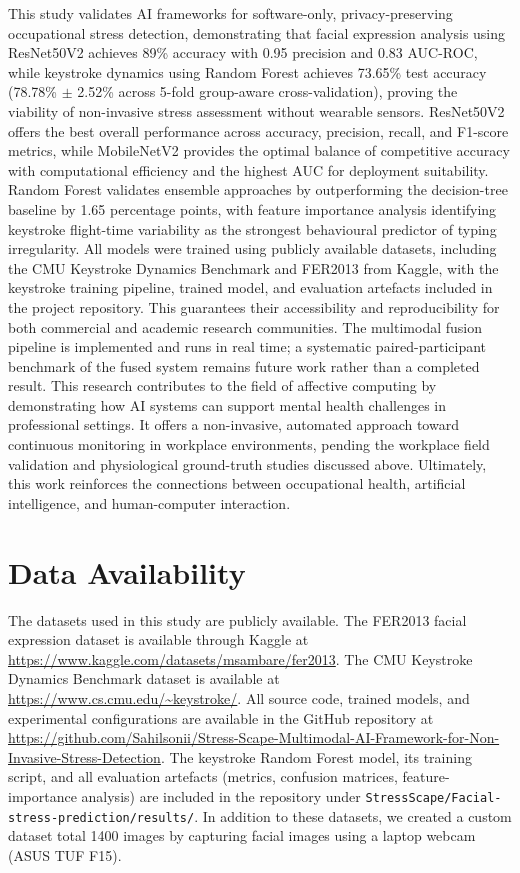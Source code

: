 \documentclass[fleqn,10pt]{wlscirep}
\begin{document}
This study validates AI frameworks for software-only, privacy-preserving occupational stress detection, demonstrating that facial expression analysis using ResNet50V2 achieves 89\% accuracy with 0.95 precision and 0.83 AUC-ROC, while keystroke dynamics using Random Forest achieves 73.65\% test accuracy (78.78\% $\pm$ 2.52\% across 5-fold group-aware cross-validation), proving the viability of non-invasive stress assessment without wearable sensors. ResNet50V2 offers the best overall performance across accuracy, precision, recall, and F1-score metrics, while MobileNetV2 provides the optimal balance of competitive accuracy with computational efficiency and the highest AUC for deployment suitability. Random Forest validates ensemble approaches by outperforming the decision-tree baseline by 1.65 percentage points, with feature importance analysis identifying keystroke flight-time variability as the strongest behavioural predictor of typing irregularity. All models were trained using publicly available datasets, including the CMU Keystroke Dynamics Benchmark and FER2013 from Kaggle, with the keystroke training pipeline, trained model, and evaluation artefacts included in the project repository. This guarantees their accessibility and reproducibility for both commercial and academic research communities. The multimodal fusion pipeline is implemented and runs in real time; a systematic paired-participant benchmark of the fused system remains future work rather than a completed result. This research contributes to the field of affective computing by demonstrating how AI systems can support mental health challenges in professional settings. It offers a non-invasive, automated approach toward continuous monitoring in workplace environments, pending the workplace field validation and physiological ground-truth studies discussed above. Ultimately, this work reinforces the connections between occupational health, artificial intelligence, and human-computer interaction.

\section*{Data Availability}

The datasets used in this study are publicly available. The FER2013 facial expression dataset is available through Kaggle at \url{https://www.kaggle.com/datasets/msambare/fer2013}. The CMU Keystroke Dynamics Benchmark dataset is available at \url{https://www.cs.cmu.edu/~keystroke/}. All source code, trained models, and experimental configurations are available in the GitHub repository at \url{https://github.com/Sahilsonii/Stress-Scape-Multimodal-AI-Framework-for-Non-Invasive-Stress-Detection}. The keystroke Random Forest model, its training script, and all evaluation artefacts (metrics, confusion matrices, feature-importance analysis) are included in the repository under \texttt{StressScape/Facial-stress-prediction/results/}. In addition to these datasets, we created a custom dataset total 1400 images by capturing facial images using a laptop webcam (ASUS TUF F15).
\end{document}
